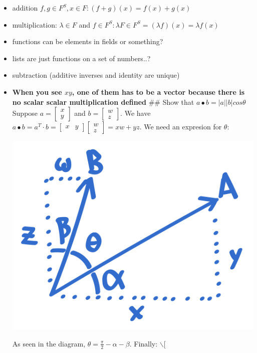 \documentclass[letterpaper]{article}
\begin{document}
\begin{itemize}
\item addition \(f, g \in F^S, x \in F: (f + g)(x) = f(x)+g(x)\)
\item multiplication: \(\lambda \in F\) and
\(f \in F^S : \lambda F \in F^S = (\lambda f)(x) = \lambda f(x)\)
\item functions can be elements in fields or something?
\item lists are just functions on a set of numbers..?
\item subtraction (additive inverses and identity are unique)
\item \textbf{When you see \(xy\), one of them has to be a vector because there is
no scalar scalar multiplication defined} \#\# Show that
\(a\bullet b = |a||b|cos\theta\) Suppose
\(a = \begin{bmatrix}x\\y\end{bmatrix}\) and
\(b = \begin{bmatrix}w\\z\end{bmatrix}\). We have
\(a\bullet b = a^T\cdot b = \begin{bmatrix}x&y\end{bmatrix} \begin{bmatrix}w\\z\end{bmatrix} = xw+yz\).
We need an expresion for \(\theta\):
\begin{center}
\includegraphics[width=.9\linewidth]{KBe20math530retDotProductProofFig.png}
\end{center} As seen in the diagram,
\(\theta = \frac{\pi}{2} - \alpha - \beta\). Finally: $\backslash$[

\end{itemize}
\end{document}
